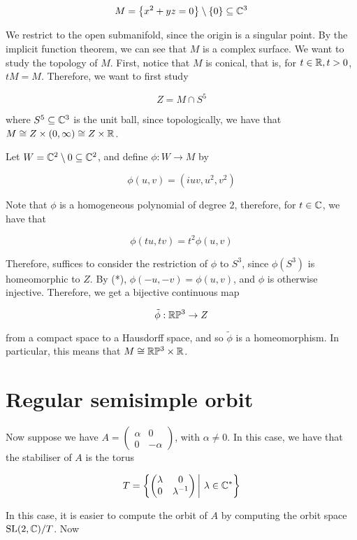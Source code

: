 \documentclass{article}
\begin{document}
\[M = \left\{x^2 + yz = 0\right\} \setminus \{0\} \subseteq \mathbb{C}^3\]

We restrict to the open submanifold, since the origin is a singular point. By the implicit function theorem, we can see that \(M\) is a complex surface. We want to study the topology of \(M\). First, notice that \(M\) is conical, that is, for \(t \in \mathbb{R}, t > 0\), \(tM = M\). Therefore, we want to first study

\[Z = M \cap S^5\]

where \(S^5 \subseteq \mathbb{C}^3\) is the unit ball, since topologically, we have that \(M \cong Z \times (0, \infty) \cong Z \times \mathbb{R}\).

Let \(W = \mathbb{C}^2 \setminus 0 \subseteq \mathbb{C}^2\), and define \(\phi : W \to M\) by

\[\phi(u, v) = (iuv, u^2, v^2)\]

Note that \(\phi\) is a homogeneous polynomial of degree \(2\), therefore, for \(t \in \mathbb{C}\), we have that

\[\phi(tu, tv) = t^2\phi(u, v) \tag{*}\]

Therefore, suffices to consider the restriction of \(\phi\) to \(S^3\), since \(\phi(S^3)\) is homeomorphic to \(Z\). By (*), \(\phi(-u, -v) = \phi(u, v)\), and \(\phi\) is otherwise injective. Therefore, we get a bijective continuous map

\[\tilde\phi : \mathbb{R}\mathbb{P}^3 \to Z\]

from a compact space to a Hausdorff space, and so \(\tilde\phi\) is a homeomorphism. In particular, this means that \(M \cong \mathbb{R}\mathbb{P}^3 \times \mathbb{R}\).

\section{Regular semisimple orbit}

Now suppose we have \(A = \begin{pmatrix}
    \alpha & 0 \\ 0 & -\alpha
\end{pmatrix}\), with \(\alpha \ne 0\). In this case, we have that the stabiliser of \(A\) is the torus

\[T = \left\{\begin{pmatrix}
    \lambda & 0 \\ 0 & \lambda^{-1}
\end{pmatrix} \bigg\vert\ \lambda \in \mathbb{C}^*\right\}\]

In this case, it is easier to compute the orbit of \(A\) by computing the orbit space \(\operatorname{SL}(2, \mathbb{C})/T\). Now
\end{document}
